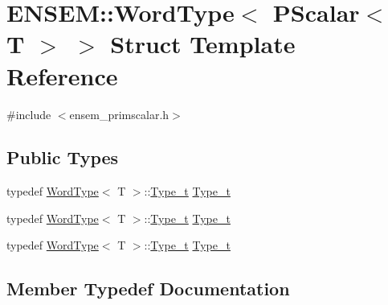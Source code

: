 \hypertarget{structENSEM_1_1WordType_3_01PScalar_3_01T_01_4_01_4}{}\section{E\+N\+S\+EM\+:\+:Word\+Type$<$ P\+Scalar$<$ T $>$ $>$ Struct Template Reference}
\label{structENSEM_1_1WordType_3_01PScalar_3_01T_01_4_01_4}


{\ttfamily \#include $<$ensem\+\_\+primscalar.\+h$>$}

\subsection*{Public Types}
\begin{DoxyCompactItemize}
\item 
typedef \mbox{\hyperlink{structENSEM_1_1WordType}{Word\+Type}}$<$ T $>$\+::\mbox{\hyperlink{structENSEM_1_1WordType_3_01PScalar_3_01T_01_4_01_4_a18e643a2710c1d27fed12cd1c6b2bfaf}{Type\+\_\+t}} \mbox{\hyperlink{structENSEM_1_1WordType_3_01PScalar_3_01T_01_4_01_4_a18e643a2710c1d27fed12cd1c6b2bfaf}{Type\+\_\+t}}
\item 
typedef \mbox{\hyperlink{structENSEM_1_1WordType}{Word\+Type}}$<$ T $>$\+::\mbox{\hyperlink{structENSEM_1_1WordType_3_01PScalar_3_01T_01_4_01_4_a18e643a2710c1d27fed12cd1c6b2bfaf}{Type\+\_\+t}} \mbox{\hyperlink{structENSEM_1_1WordType_3_01PScalar_3_01T_01_4_01_4_a18e643a2710c1d27fed12cd1c6b2bfaf}{Type\+\_\+t}}
\item 
typedef \mbox{\hyperlink{structENSEM_1_1WordType}{Word\+Type}}$<$ T $>$\+::\mbox{\hyperlink{structENSEM_1_1WordType_3_01PScalar_3_01T_01_4_01_4_a18e643a2710c1d27fed12cd1c6b2bfaf}{Type\+\_\+t}} \mbox{\hyperlink{structENSEM_1_1WordType_3_01PScalar_3_01T_01_4_01_4_a18e643a2710c1d27fed12cd1c6b2bfaf}{Type\+\_\+t}}
\end{DoxyCompactItemize}


\subsection{Member Typedef Documentation}
\mbox{\label{structENSEM_1_1WordType_3_01PScalar_3_01T_01_4_01_4_a18e643a2710c1d27fed12cd1c6b2bfaf}} 
